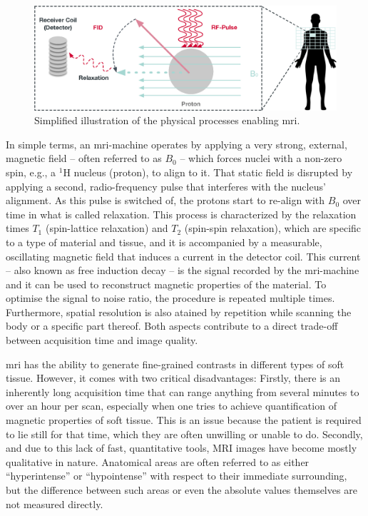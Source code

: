 \begin{figure}[b]
    \centering
    \includegraphics[width=\textwidth]{figures/mri.eps}
    \caption{Simplified illustration of the physical processes enabling \acrshort{mri}.}
    \label{figure:mri}
\end{figure}

In simple terms, an \acrshort{mri}-machine operates by applying a very strong, external, magnetic field -- often referred to as $B_0$ -- which forces nuclei with a non-zero spin, e.g., a $^{1}\text{H}$ nucleus (proton), to align to it. That static field is disrupted by applying a second, radio-frequency pulse that interferes with the nucleus' alignment. As this pulse is switched of, the protons start to re-align with $B_0$ over time in what is called relaxation. This process is characterized by the relaxation times $T_1$ (spin-lattice relaxation) and $T_2$ (spin-spin relaxation), which are specific to a type of material and tissue, and it is accompanied by a measurable, oscillating magnetic field that induces a current in the detector coil. This current -- also known as free induction decay -- is the signal recorded by the \acrshort{mri}-machine and it can be used to reconstruct magnetic properties of the material. To optimise the signal to noise ratio, the procedure is repeated multiple times. Furthermore, spatial resolution is also atained by repetition while scanning the body or a specific part thereof. Both aspects contribute to a direct trade-off between acquisition time and image quality.

\acrshort{mri} has the ability to generate fine-grained contrasts in different types of soft tissue. However, it comes with two critical disadvantages: Firstly, there is an inherently long acquisition time that can range anything from several minutes to over an hour per scan, especially when one tries to achieve quantification of magnetic properties of soft tissue. This is an issue because the patient is required to lie still for that time, which they are often unwilling or unable to do. Secondly, and due to this lack of fast, quantitative tools, MRI images have become mostly qualitative in nature. Anatomical areas are often referred to as either ``hyperintense'' or ``hypointense'' with respect to their immediate surrounding, but the difference between such areas or even the absolute values themselves are not measured directly.

